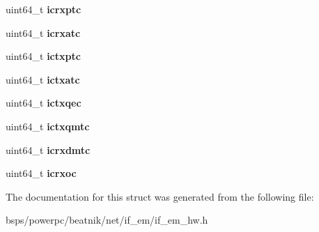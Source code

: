 \begin{DoxyCompactItemize}
\item 
\mbox{\label{structem__hw__stats_afa6e419e54871429af447ecb7f17d975}} 
uint64\+\_\+t {\bfseries icrxptc}
\item 
\mbox{\label{structem__hw__stats_afada6510481f195a92ef51b060d9436f}} 
uint64\+\_\+t {\bfseries icrxatc}
\item 
\mbox{\label{structem__hw__stats_aecd8662d5fbf0d51a93f9a64f33595b8}} 
uint64\+\_\+t {\bfseries ictxptc}
\item 
\mbox{\label{structem__hw__stats_a7825c6970ffe794c722b875a41f6dd00}} 
uint64\+\_\+t {\bfseries ictxatc}
\item 
\mbox{\label{structem__hw__stats_a459a77a5aa218974050cdc349a7e11f0}} 
uint64\+\_\+t {\bfseries ictxqec}
\item 
\mbox{\label{structem__hw__stats_a90010636c182dad5b4ce78c336f2a44f}} 
uint64\+\_\+t {\bfseries ictxqmtc}
\item 
\mbox{\label{structem__hw__stats_a3b6009bd7fa93910c40322351dc2e17e}} 
uint64\+\_\+t {\bfseries icrxdmtc}
\item 
\mbox{\label{structem__hw__stats_a1fad8d792dea83de636c9c215395335b}} 
uint64\+\_\+t {\bfseries icrxoc}
\end{DoxyCompactItemize}


The documentation for this struct was generated from the following file\+:\begin{DoxyCompactItemize}
\item 
bsps/powerpc/beatnik/net/if\+\_\+em/if\+\_\+em\+\_\+hw.\+h\end{DoxyCompactItemize}
